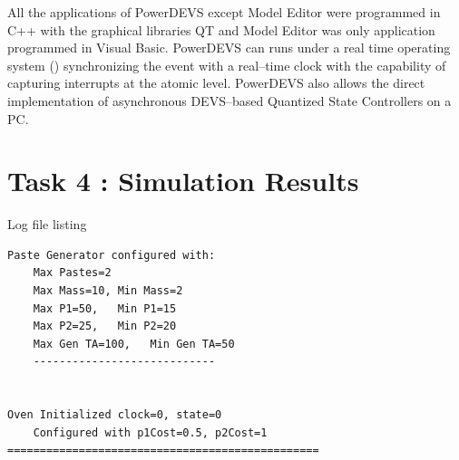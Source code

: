 \documentclass[titlepage]{article}%
\begin{document}
{All the applications of PowerDEVS except Model Editor were programmed in C++ with the graphical libraries QT and Model Editor was only application programmed in Visual Basic. PowerDEVS can runs under a real time operating system (\cite{ManRTI}) synchronizing the event with a real–time clock with the capability of capturing interrupts at the atomic level. PowerDEVS also allows the direct implementation of asynchronous DEVS–based Quantized State Controllers \cite{Kof03b} on a PC.








\section{Task 4 : Simulation Results}


Log file listing
\begin{verbatim}
Paste Generator configured with:
	Max Pastes=2
	Max Mass=10, Min Mass=2
	Max P1=50,   Min P1=15
	Max P2=25,   Min P2=20
	Max Gen TA=100,   Min Gen TA=50
	----------------------------


Oven Initialized clock=0, state=0
	Configured with p1Cost=0.5, p2Cost=1
================================================


\end{verbatim}}
\end{document}
